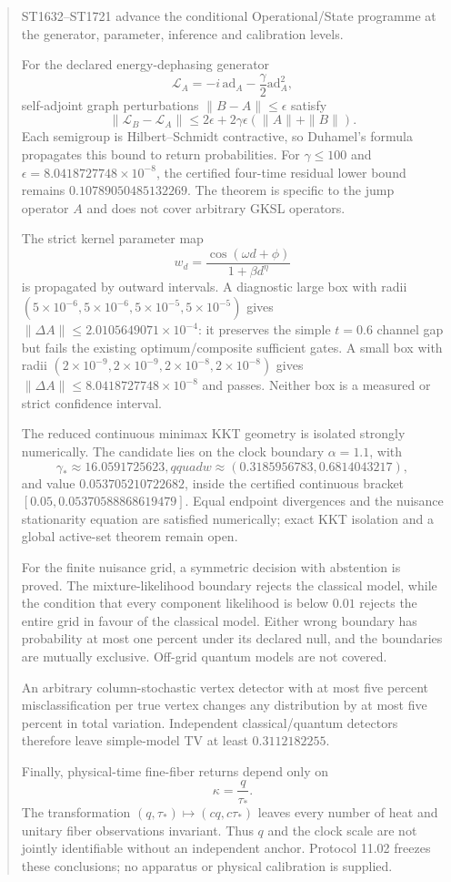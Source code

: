 \documentclass[11pt,a4paper]{article}
\begin{document}
\begin{abstract}
ST1632--ST1721 advance the conditional Operational/State programme at the
generator, parameter, inference and calibration levels.

For the declared energy-dephasing generator
\[
\mathcal L_A=-i\,\mathrm{ad}_A-\frac{\gamma}{2}\mathrm{ad}_A^2,
\]
self-adjoint graph perturbations $\|B-A\|\le\epsilon$ satisfy
\[
\|\mathcal L_B-\mathcal L_A\|
\le2\epsilon+2\gamma\epsilon(\|A\|+\|B\|).
\]
Each semigroup is Hilbert--Schmidt contractive, so Duhamel's formula propagates
this bound to return probabilities.  For $\gamma\le100$ and
$\epsilon=8.0418727748\times10^{-8}$, the certified four-time residual lower
bound remains $0.10789050485132269$.  The theorem is specific to the jump
operator $A$ and does not cover arbitrary GKSL operators.

The strict kernel parameter map
\[
w_d=\frac{\cos(\omega d+\phi)}{1+\beta d^\eta}
\]
is propagated by outward intervals.  A diagnostic large box with radii
$(5\times10^{-6},5\times10^{-6},5\times10^{-5},5\times10^{-5})$ gives
$\|\Delta A\|\le2.0105649071\times10^{-4}$: it preserves the simple
$t=0.6$ channel gap but fails the existing optimum/composite sufficient gates.
A small box with radii
$(2\times10^{-9},2\times10^{-9},2\times10^{-8},2\times10^{-8})$ gives
$\|\Delta A\|\le8.0418727748\times10^{-8}$ and passes.  Neither box is a
measured or strict confidence interval.

The reduced continuous minimax KKT geometry is isolated strongly numerically.
The candidate lies on the clock boundary $\alpha=1.1$, with
\[
\gamma_*\approx16.0591725623,qquad
w\approx(0.3185956783,0.6814043217),
\]
and value $0.053705210722682$, inside the certified continuous bracket
$[0.05,0.05370588868619479]$.  Equal endpoint divergences and the nuisance
stationarity equation are satisfied numerically; exact KKT isolation and a
global active-set theorem remain open.

For the finite nuisance grid, a symmetric decision with abstention is proved.
The mixture-likelihood boundary rejects the classical model, while the
condition that every component likelihood is below $0.01$ rejects the entire
grid in favour of the classical model.  Either wrong boundary has probability
at most one percent under its declared null, and the boundaries are mutually
exclusive.  Off-grid quantum models are not covered.

An arbitrary column-stochastic vertex detector with at most five percent
misclassification per true vertex changes any distribution by at most five
percent in total variation.  Independent classical/quantum detectors therefore
leave simple-model TV at least $0.3112182255$.

Finally, physical-time fine-fiber returns depend only on
\[
\kappa=\frac{q}{\tau_*}.
\]
The transformation $(q,\tau_*)\mapsto(cq,c\tau_*)$ leaves every number of heat
and unitary fiber observations invariant.  Thus $q$ and the clock scale are
not jointly identifiable without an independent anchor.  Protocol 11.02
freezes these conclusions; no apparatus or physical calibration is supplied.
\end{abstract}
\end{document}
